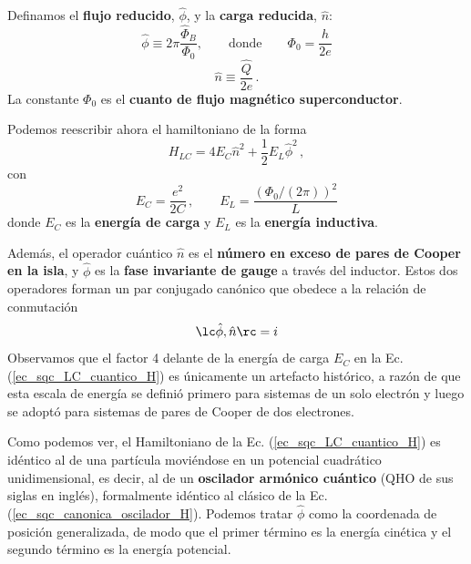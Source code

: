
        Definamos el \textbf{flujo reducido}, $\hat{\phi}$, y la \textbf{carga reducida}, $\hat{n}$:
        \begin{equation}
            \hat{\phi} \equiv 2 \pi \frac{\hat{\Phi}_B}{\Phi_0}, \qquad \text{donde} \qquad \Phi_0 = \frac{h}{2e}
        \end{equation}
        \begin{equation} \label{ec_scq_carga_reducida}
            \hat{n} \equiv \frac{\hat{Q}}{2e}\, .
        \end{equation}
        La constante $\Phi_0$ es el \textbf{cuanto de flujo magnético superconductor}.

        Podemos reescribir ahora el hamiltoniano de la forma
        \begin{equation} \label{ec_sqc_LC_cuantico_H}
            H_{LC} = 4 E_C \hat{n}^2 + \frac{1}{2} E_L \hat{\phi}^2 \, ,
        \end{equation}
        con 
        \begin{equation}
            E_C = \frac{e^2}{2C} \, ,
            \qquad
            E_L = \frac{(\Phi_0/(2 \pi))^2}{L}
        \end{equation}
        donde $E_C$ es la \textbf{energía de carga} y $E_L$ es la \textbf{energía inductiva}.

        Además, el operador cuántico $\hat{n}$ es el \textbf{número en exceso de pares de Cooper en la isla}, y $\hat{\phi}$ es la \textbf{fase invariante de gauge} a través del inductor.  Estos dos operadores forman un par conjugado canónico que obedece a la relación de conmutación 
        \begin{equation}
        \lc \hat{\phi}, \hat{n} \rc = i    
        \end{equation}
        Observamos que el factor 4 delante de la energía de carga $E_C$ en la Ec. (\ref{ec_sqc_LC_cuantico_H}) es únicamente un artefacto histórico, a razón de que esta escala de energía se definió primero para sistemas de un solo electrón y luego se adoptó para sistemas de pares de Cooper de dos electrones.

        Como podemos ver, el Hamiltoniano de la Ec. (\ref{ec_sqc_LC_cuantico_H}) es idéntico al de una partícula moviéndose en un potencial cuadrático unidimensional, es decir, al de un \textbf{oscilador armónico cuántico} (QHO de sus siglas en inglés), formalmente idéntico al clásico de la Ec. (\ref{ec_sqc_canonica_oscilador_H}). Podemos tratar $\hat{\phi}$ como la coordenada de posición generalizada, de modo que el primer término es la energía cinética y el segundo término es la energía potencial. 

